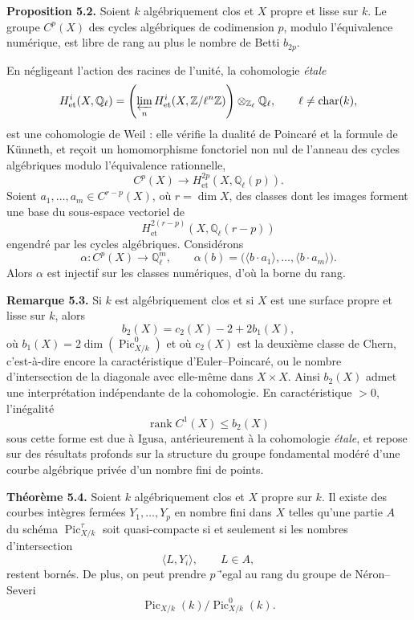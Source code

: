 \documentclass[11pt]{article}
\providecommand{\Pic}{\operatorname{Pic}}
\providecommand{\Z}{\mathbb Z}
\providecommand{\Q}{\mathbb Q}
\providecommand{\rank}{\operatorname{rank}}
\begin{document}
\textbf{Proposition 5.2.} Soient $k$ alg\'ebriquement clos et $X$ propre et lisse sur $k$. Le groupe $C^p(X)$ des cycles alg\'ebriques de codimension $p$, modulo l'\'equivalence num\'erique, est libre de rang au plus le nombre de Betti $b_{2p}$.

En n\'egligeant l'action des racines de l'unit\'e, la cohomologie \textit{étale}
\[
   H^i_{\mathrm{et}}(X,\Q_\ell)
   =\left(\varprojlim_n H^i_{\mathrm{et}}(X,\Z/\ell^n\Z)\right)\otimes_{\Z_\ell}\Q_\ell,
   \qquad \ell\ne\operatorname{char}(k),
\]
est une cohomologie de Weil : elle v\'erifie la dualit\'e de Poincar\'e et la formule de K\"unneth, et re\c{c}oit un homomorphisme fonctoriel non nul de l'anneau des cycles alg\'ebriques modulo l'\'equivalence rationnelle,
\[
   C^p(X)\longrightarrow H^{2p}_{\mathrm{et}}(X,\Q_\ell(p)).
\]
Soient $a_1,\ldots,a_m\in C^{r-p}(X)$, o\`u $r=\dim X$, des classes dont les images forment une base du sous-espace vectoriel de
\[
   H^{2(r-p)}_{\mathrm{et}}(X,\Q_\ell(r-p))
\]
engendr\'e par les cycles alg\'ebriques. Consid\'erons
\[
   \alpha:C^p(X)\longrightarrow \Q_\ell^m,
   \qquad
   \alpha(b)=\bigl(\langle b\cdot a_1\rangle,\ldots,\langle b\cdot a_m\rangle\bigr).
\]
Alors $\alpha$ est injectif sur les classes num\'eriques, d'o\`u la borne du rang.

\textbf{Remarque 5.3.} Si $k$ est alg\'ebriquement clos et si $X$ est une surface propre et lisse sur $k$, alors
\[
   b_2(X)=c_2(X)-2+2b_1(X),
\]
o\`u $b_1(X)=2\dim(\Pic^0_{X/k})$ et o\`u $c_2(X)$ est la deuxi\`eme classe de Chern, c'est-\`a-dire encore la caract\'eristique d'Euler--Poincar\'e, ou le nombre d'intersection de la diagonale avec elle-m\^eme dans $X\times X$. Ainsi $b_2(X)$ admet une interpr\'etation ind\'ependante de la cohomologie. En caract\'eristique $>0$, l'in\'egalit\'e
\[
   \rank C^1(X)\le b_2(X)
\]
sous cette forme est due \`a Igusa, ant\'erieurement \`a la cohomologie \textit{étale}, et repose sur des r\'esultats profonds sur la structure du groupe fondamental mod\'er\'e d'une courbe alg\'ebrique priv\'ee d'un nombre fini de points.

\textbf{Th\'eor\`eme 5.4.} Soient $k$ alg\'ebriquement clos et $X$ propre sur $k$. Il existe des courbes int\`egres ferm\'ees $Y_1,\ldots,Y_p$ en nombre fini dans $X$ telles qu'une partie $A$ du sch\'ema $\Pic^\tau_{X/k}$ soit quasi-compacte si et seulement si les nombres d'intersection
\[
   \langle L,Y_i\rangle,\qquad L\in A,
\]
restent born\'es. De plus, on peut prendre $p$ \='egal au rang du groupe de N\'eron--Severi
\[
   \Pic_{X/k}(k)/\Pic^0_{X/k}(k).
\]
\end{document}
